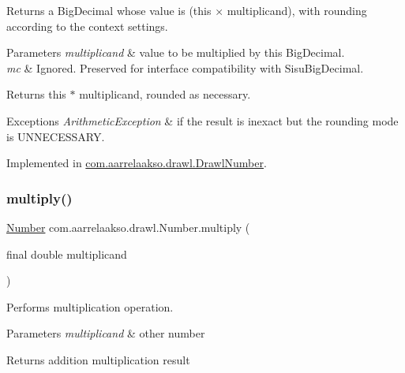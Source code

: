 Returns a Big\+Decimal whose value is (this × multiplicand), with rounding according to the context settings. 


\begin{DoxyParams}{Parameters}
{\em multiplicand} & value to be multiplied by this Big\+Decimal. \\
\hline
{\em mc} & Ignored. Preserved for interface compatibility with Sisu\+Big\+Decimal. \\
\hline
\end{DoxyParams}
\begin{DoxyReturn}{Returns}
this $\ast$ multiplicand, rounded as necessary. 
\end{DoxyReturn}

\begin{DoxyExceptions}{Exceptions}
{\em Arithmetic\+Exception} & if the result is inexact but the rounding mode is U\+N\+N\+E\+C\+E\+S\+S\+A\+RY. \\
\hline
\end{DoxyExceptions}


Implemented in \hyperlink{classcom_1_1aarrelaakso_1_1drawl_1_1_drawl_number_a11144527a91f9a750b9042a3ac84f631}{com.\+aarrelaakso.\+drawl.\+Drawl\+Number}.

\mbox{\label{interfacecom_1_1aarrelaakso_1_1drawl_1_1_number_a47435944efde1dec963b401dbdf45d62}} 
\subsubsection{\texorpdfstring{multiply()}{multiply()}\hspace{0.1cm}{\footnotesize\ttfamily [3/3]}}
{\footnotesize\ttfamily \hyperlink{interfacecom_1_1aarrelaakso_1_1drawl_1_1_number}{Number} com.\+aarrelaakso.\+drawl.\+Number.\+multiply (\begin{DoxyParamCaption}\item[{final double}]{multiplicand }\end{DoxyParamCaption})}



Performs multiplication operation. 


\begin{DoxyParams}{Parameters}
{\em multiplicand} & other number \\
\hline
\end{DoxyParams}
\begin{DoxyReturn}{Returns}
addition multiplication result 
\end{DoxyReturn}



